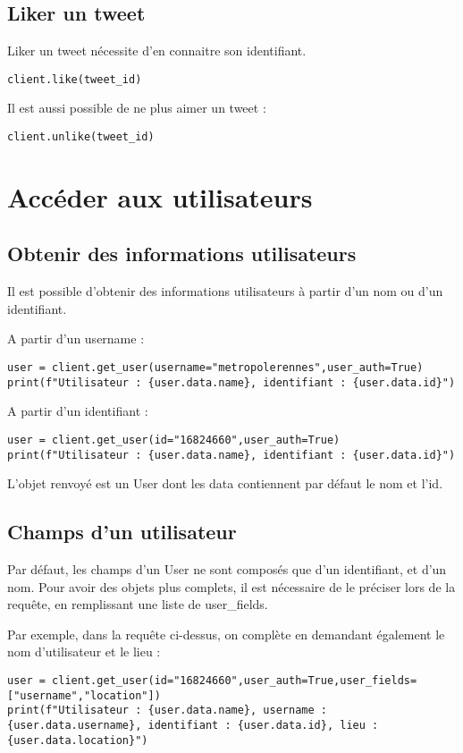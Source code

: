 \documentclass[11pt,a4paper]{article}
\begin{document}
\subsection{Liker un tweet}
Liker un tweet nécessite d'en connaitre son identifiant. 
\begin{lstlisting}
client.like(tweet_id)
\end{lstlisting}

Il est aussi possible de ne plus aimer un tweet : 
\begin{lstlisting}
client.unlike(tweet_id)
\end{lstlisting}
\section{Accéder aux utilisateurs}

\subsection{Obtenir des informations utilisateurs}

Il est possible d'obtenir des informations utilisateurs à partir d'un nom ou d'un identifiant.


A partir d'un username : 
\begin{lstlisting}
user = client.get_user(username="metropolerennes",user_auth=True)
print(f"Utilisateur : {user.data.name}, identifiant : {user.data.id}")
\end{lstlisting}

A partir d'un identifiant : 

\begin{lstlisting}
user = client.get_user(id="16824660",user_auth=True)
print(f"Utilisateur : {user.data.name}, identifiant : {user.data.id}")
\end{lstlisting}

L'objet renvoyé est un User dont les data contiennent par défaut le nom et l'id.

\subsection{Champs d'un utilisateur}
Par défaut, les champs d'un User ne sont composés que d'un identifiant, et d'un nom. Pour avoir des objets plus complets, il est nécessaire de le préciser lors de la requête, en remplissant une liste de user\_fields.

Par exemple, dans la requête ci-dessus, on complète en demandant également le nom d'utilisateur et le lieu : 
\begin{lstlisting}
user = client.get_user(id="16824660",user_auth=True,user_fields=["username","location"])
print(f"Utilisateur : {user.data.name}, username :{user.data.username}, identifiant : {user.data.id}, lieu : {user.data.location}")
\end{lstlisting}
\end{document}
